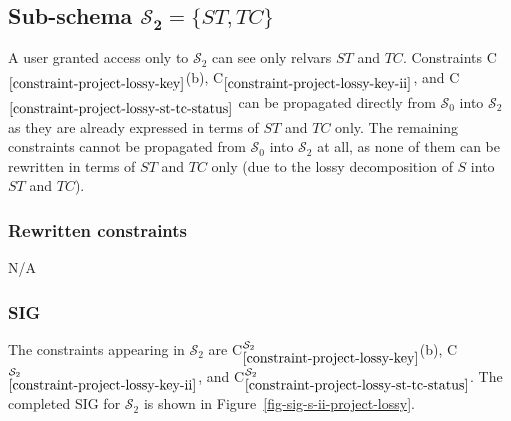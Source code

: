 \documentclass{article}
\newcounter{constraint}
\newcommand{\identifier}[1]{\ensuremath{\mathit{#1}}}
\newcommand{\ST}{\identifier{ST}}
\newcommand{\TC}{\identifier{TC}}
\newcommand{\schema}[1]{\ensuremath{\mathcal{S}_{#1}}}
\newcommand{\Constraint}[2][]{C\ensuremath{_{#2}\ifx&#1&\else^{#1}\fi}}
\begin{document}




\subsection{Sub-schema \(\bm{\schema{2} = \{\ST, \TC\}}\)}

\noindent A user granted access only to \(\schema{2}\) can see only relvars \(\ST\) and \(\TC\). Constraints \Constraint{\ref{constraint-project-lossy-key}}(b), \Constraint{\ref{constraint-project-lossy-key-ii}}, and  \Constraint{\ref{constraint-project-lossy-st-tc-status}} can be propagated directly from \(\schema{0}\) into \(\schema{2}\) as they are already expressed in terms of \(\ST\) and \(\TC\) only. The remaining constraints cannot be propagated from \(\schema{0}\) into \(\schema{2}\) at all, as none of them can be rewritten in terms of \(\ST\) and \(\TC\) only (due to the lossy decomposition of \(S\) into \(\ST\) and \(\TC\)).




\subsubsection{Rewritten constraints}
\label{sec-constraints-s-ii-project-lossy}

N/A




\subsubsection{SIG}
\label{sec-sigs-s-ii-project-lossy}

\noindent The constraints appearing in \(\schema{2}\) are \Constraint[\schema{2}]{\ref{constraint-project-lossy-key}}(b), \Constraint[\schema{2}]{\ref{constraint-project-lossy-key-ii}}, and \Constraint[\schema{2}]{\ref{constraint-project-lossy-st-tc-status}}. The completed SIG for \(\schema{2}\) is shown in Figure~\ref{fig-sig-s-ii-project-lossy}.

\end{document}
